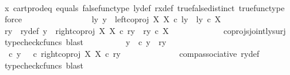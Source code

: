 \begin{isabellebody}
\ \ \ \ \ \ \ \ \ \ \isamarkupfalse%
\ {\isasymrho}x\ cart{\isacharunderscore}{\kern0pt}prod{\isacharunderscore}{\kern0pt}eq{}\ equals\ false{\isacharunderscore}{\kern0pt}func{\isacharunderscore}{\kern0pt}type\ ly{\isacharunderscore}{\kern0pt}def\ rx{\isacharunderscore}{\kern0pt}def\ true{\isacharunderscore}{\kern0pt}false{\isacharunderscore}{\kern0pt}distinct\ true{\isacharunderscore}{\kern0pt}func{\isacharunderscore}{\kern0pt}type\ \isamarkupfalse%
\ force\isanewline
\ \ \ \ \ \ \isamarkupfalse%
\isanewline
\ \ \ \ \ \ \ \ \isamarkupfalse%
\ {\isachardoublequoteopen}{\isasymnexists}ly{\isachardot}{\kern0pt}\ y\ {\isacharequal}{\kern0pt}\ left{\isacharunderscore}{\kern0pt}coproj\ X\ X\ {\isasymcirc}\isactrlsub c\ ly\ {\isasymand}\ ly\ {\isasymin}\isactrlsub c\ X{\isachardoublequoteclose}\isanewline
\ \ \ \ \ \ \ \ \isamarkupfalse%
\ \isamarkupfalse%
\ ry\ \ ry{\isacharunderscore}{\kern0pt}def{\isacharcolon}{\kern0pt}\ {\isachardoublequoteopen}y\ {\isacharequal}{\kern0pt}\ right{\isacharunderscore}{\kern0pt}coproj\ X\ X\ {\isasymcirc}\isactrlsub c\ ry\ {\isasymand}\ ry\ {\isasymin}\isactrlsub c\ X{\isachardoublequoteclose}\isanewline
\ \ \ \ \ \ \ \ \ \ \isamarkupfalse%
\ \ coprojs{\isacharunderscore}{\kern0pt}jointly{\isacharunderscore}{\kern0pt}surj\ \isamarkupfalse%
\ {\isacharparenleft}{\kern0pt}typecheck{\isacharunderscore}{\kern0pt}cfuncs{\isacharcomma}{\kern0pt}\ blast{\isacharparenright}{\kern0pt}\isanewline
\ \ \ \ \ \ \ \ \isamarkupfalse%
\ {\isasymrho}y{\isacharcolon}{\kern0pt}\ {\isachardoublequoteopen}{\isasymrho}\ {\isasymcirc}\isactrlsub c\ y\ {\isacharequal}{\kern0pt}\ {\isasymlangle}ry{\isacharcomma}{\kern0pt}\ {\isasymf}{\isasymrangle}{\isachardoublequoteclose}\isanewline
\ \ \ \ \ \ \ \ \isamarkupfalse%
\ {\isacharminus}{\kern0pt}\ \isanewline
\ \ \ \ \ \ \ \ \ \ \isamarkupfalse%
\ {\isachardoublequoteopen}{\isasymrho}\ {\isasymcirc}\isactrlsub c\ y\ {\isacharequal}{\kern0pt}\ {\isacharparenleft}{\kern0pt}{\isasymrho}\ {\isasymcirc}\isactrlsub c\ right{\isacharunderscore}{\kern0pt}coproj\ X\ X{\isacharparenright}{\kern0pt}\ {\isasymcirc}\isactrlsub c\ ry{\isachardoublequoteclose}\isanewline
\ \ \ \ \ \ \ \ \ \ \ \ \isamarkupfalse%
\ comp{\isacharunderscore}{\kern0pt}associative{}\ ry{\isacharunderscore}{\kern0pt}def\ \isamarkupfalse%
\ {\isacharparenleft}{\kern0pt}typecheck{\isacharunderscore}{\kern0pt}cfuncs{\isacharcomma}{\kern0pt}\ blast{\isacharparenright}{\kern0pt}\isanewline

\end{isabellebody}
